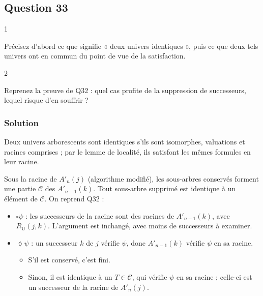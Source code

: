 \documentclass[11pt,a4paper]{article}
\providecommand{\tightlist}{\setlength{\itemsep}{0pt}\setlength{\parskip}{0pt}}
\providecommand{\Box}{\square}
\providecommand{\Diamond}{\lozenge}
\begin{document}
\hypertarget{question-33}{%
\subsection{Question 33}\label{question-33}}

\begin{indication}{1}

Précisez d'abord ce que signifie « deux univers identiques », puis ce que deux tels univers ont en commun du point de vue de la satisfaction.

\end{indication}

\begin{indication}{2}

Reprenez la preuve de Q32 : quel cas profite de la suppression de successeurs, lequel risque d'en souffrir ?

\end{indication}

\hypertarget{solution-32}{%
\subsubsection{Solution}\label{solution-32}}

Deux univers arborescents sont identiques s'ils sont isomorphes, valuations et racines comprises ; par le lemme de localité, ils satisfont les mêmes formules en leur racine.

Sous la racine de \(A'_n(j)\) (algorithme modifié), les sous-arbres conservés forment une partie \(\mathcal C\) des \(A'_{n-1}(k)\). Tout sous-arbre supprimé est identique à un élément de \(\mathcal C\). On reprend Q32 :

\begin{itemize}
\tightlist
\item
  \(\Box\psi\) : les successeurs de la racine sont des racines de \(A'_{n-1}(k)\), avec \(R_{\mathbb U}(j,k)\). L'argument est inchangé, avec moins de successeurs à examiner.
\item
  \(\Diamond\psi\) : un successeur \(k\) de \(j\) vérifie \(\psi\), donc \(A'_{n-1}(k)\) vérifie \(\psi\) en sa racine.

  \begin{itemize}
  \tightlist
  \item
    S'il est conservé, c'est fini.
  \item
    Sinon, il est identique à un \(T\in\mathcal C\), qui vérifie \(\psi\) en sa racine ; celle-ci est un successeur de la racine de \(A'_n(j)\).
  \end{itemize}
\end{itemize}
\end{document}
